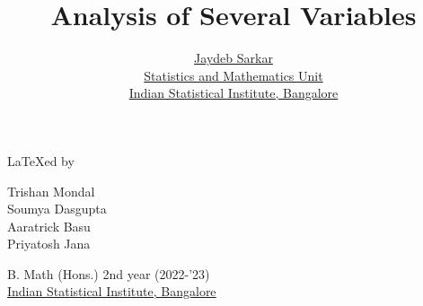 \documentclass{report}
\title{\Huge Analysis of Several Variables}
\author{{\LARGE \href{https://www.isibang.ac.in/~jay/}{Jaydeb Sarkar}} \\[0.5cm]
  \href{https://www.isibang.ac.in/~statmath}{Statistics and Mathematics Unit} \\
  \href{https://www.isibang.ac.in}{Indian Statistical Institute, Bangalore}}
\date{}
\begin{document}



\maketitle

{\vspace*{\fill}\centering
  {\LARGE \LaTeX ed by}
  \vspace{0.5cm}
  \begin{center}
    \large
    Trishan Mondal \\
    Soumya Dasgupta \\
    Aaratrick Basu \\
    Priyatosh Jana
  \end{center}
  \vspace{0.5cm}
  \begin{center}
    B. Math (Hons.) 2nd year (2022-'23) \\
    \href{https://www.isibang.ac.in}{Indian Statistical Institute, Bangalore}
  \end{center}
  \vspace*{\fill}}

\tableofcontents





% 















\end{document}
